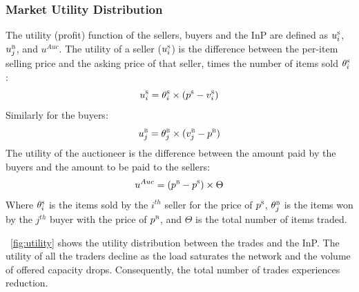 \subsubsection{Market Utility Distribution}
The utility (profit) function of the sellers, buyers and the InP are defined as $u_{i}^\textsc{s}$, $u_{j}^\textsc{b}$, and $u^{Auc}$.
The utility of a seller ($u_{i}^\textsc{s}$) is the difference between the per-item selling price and the asking price of that seller, times the number of items sold $\theta_{i}^\textsc{s}$:
\begin{equation}
\vspace{-1mm}
\label{seller_utility_formula}
u_{i}^\textsc{s} = {\theta_{i}^\textsc{s}}  \times (p^\textsc{s} - {v_{i}^\textsc{s}})
\end{equation}
Similarly for the buyers:
\begin{equation}
\vspace{-1mm}
\label{buyer_utility_formula}
u_{j}^\textsc{b} = {\theta_{j}^\textsc{b}}  \times ({v_{j}^\textsc{b}}-p^\textsc{b})
\end{equation}
The utility of the auctioneer is the difference between the amount paid by the buyers and the amount to be paid to the sellers:
\begin{eqnarray}
\vspace{-4mm}
u^{Auc} = (p^\textsc{b} - p^\textsc{s}) \times \Theta
\end{eqnarray}
 Where $\theta_{i}^\textsc{s}$ is the items sold by the $i^{th}$ seller for the price of $p^\textsc{s}$, ${\theta_{j}^\textsc{b}}$ is the items won by the $j^{th}$ buyer with the price of $p^\textsc{b}$, and $\Theta$ is the total number of items traded.

\figureautorefname~\ref{fig:utility} shows the utility distribution between the trades and the InP. The utility of all the traders decline as the load saturates the network and the volume of offered capacity drops. Consequently, the total number of trades experiences reduction.




